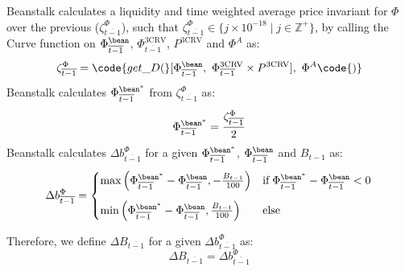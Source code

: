 \documentclass[class=article, crop=false]{standalone}
\begin{document}
\begin{enumerate}
Beanstalk calculates a liquidity and time weighted average price invariant for $\Phi$ over the previous  ($\zeta^{\Phi}_{\overline{t-1}}$), such that $\zeta^{\Phi}_{\overline{t-1}}\in \{j \times 10^{-18} \mid j \in \mathbb{Z}^{+} \}$, by calling the Curve  function on $\Phi_{\overline{t-1}}^{\bean}$, $\Phi_{\overline{t-1}}^{\text{3CRV}}$, $P^{\text{3CRV}}$ and $\Phi^{A}$ as:
$$\zeta^{\Phi}_{\overline{t-1}} = \code{get\_D(}[\Phi_{\overline{t-1}}^{\bean},\ \Phi_{\overline{t-1}}^{\text{3CRV}} \times P^{\text{3CRV}}],\ \Phi^{A}\code{)}$$
Beanstalk calculates $\Phi_{\overline{t-1}}^{{\bean}^*}$ from $\zeta^{\Phi}_{\overline{t-1}}$ as:
$$\Phi_{\overline{t-1}}^{{\bean}^*} = \frac{\zeta^{\Phi}_{\overline{t-1}}}{2}$$
Beanstalk calculates $\Delta b_{\overline{t-1}}^{\Phi}$ for a given $\Phi_{\overline{t-1}}^{{\bean}^*}$, $\Phi_{\overline{t-1}}^{\bean}$ and $B_{t-1}$ as:
$$\Delta b_{\overline{t-1}}^{\Phi} = \begin{cases} \text{max}\left(\Phi_{\overline{t-1}}^{{\bean}^*} - \Phi_{\overline{t-1}}^{\bean}, -\frac{B_{t-1}}{100}\right) & \text{if} \; \Phi_{\overline{t-1}}^{{\bean}^*} - \Phi_{\overline{t-1}}^{\bean} < 0 \vspace{.3cm} \\ 
\text{min}\left(\Phi_{\overline{t-1}}^{{\bean}^*} - \Phi_{\overline{t-1}}^{\bean}, \frac{B_{t-1}}{100}\right) & \text{else} \end{cases}$$
\end{enumerate}

Therefore, we define $\Delta B_{\overline{t-1}}$ for a given $\Delta b_{\overline{t-1}}^{\Phi}$ as:
$$\Delta B_{\overline{t-1}} = \Delta b_{\overline{t-1}}^{\Phi}$$
    
\end{document}
